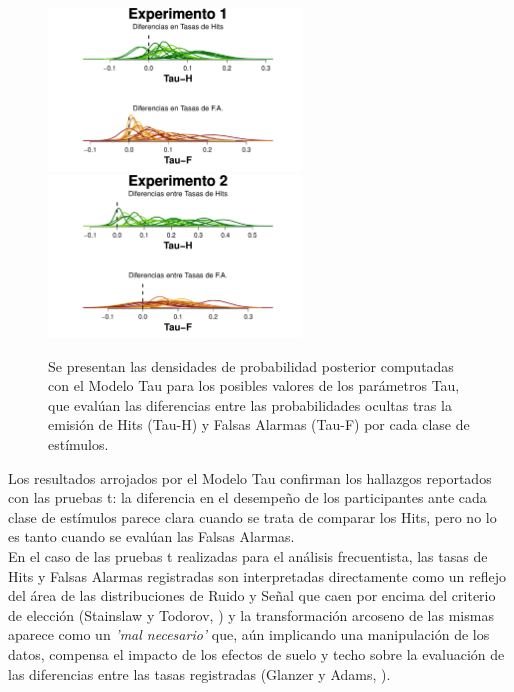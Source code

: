 \begin{figure}[th]
\centering
\includegraphics[width=0.6\textwidth]{Figures/MTau_DensidadTau_E1} \\ 
\includegraphics[width=0.6\textwidth]{Figures/MTau_DensidadTau_E2}\\
\decoRule
\caption[Modelo Tau: Densidad de probabilidad posterior para los posibles valores de los parámetros Tau]{Se presentan las densidades de probabilidad posterior computadas con el Modelo Tau para los posibles valores de los parámetros Tau, que evalúan las diferencias entre las probabilidades ocultas tras la emisión de Hits (Tau-H) y Falsas Alarmas (Tau-F) por cada clase de estímulos.}
\label{fig:Tau}
\end{figure}

Los resultados arrojados por el Modelo Tau confirman los hallazgos reportados con las pruebas t: la diferencia en el desempeño de los participantes ante cada clase de estímulos parece clara cuando se trata de comparar los Hits, pero no lo es tanto cuando se evalúan las Falsas Alarmas.\\

En el caso de las pruebas t realizadas para el análisis frecuentista, las tasas de Hits y Falsas Alarmas registradas son interpretadas directamente como un reflejo del área de las distribuciones de Ruido y Señal que caen por encima del criterio de elección (Stainslaw y Todorov, \citeyear{Stainslaw1999}) y la transformación arcoseno de las mismas aparece como un \textit{'mal necesario'} que, aún implicando una manipulación de los datos, compensa el impacto de los efectos de suelo y techo sobre la evaluación de las diferencias entre las tasas registradas (Glanzer y Adams, \citeyear{Glanzer1990}). \\ 

